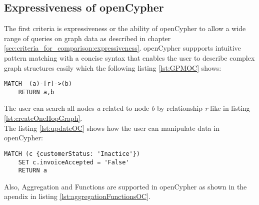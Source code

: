 \subsection{Expressiveness of openCypher}
\label{subsec:different_query_languages_for_graph_databases:openCypher:expressiveness}
The first criteria is expressiveness or the ability of openCypher to allow a wide
range of queries on graph data as described in chapter \ref{sec:criteria_for_comparison:expressiveness}. 
openCypher suppports intuitive pattern matching with a concise syntax that enables the
user to describe complex graph structures easily which the following listing \ref{lst:GPMOC} shows:
\begin{lstlisting}[caption={Graph Pattern Matching in openCypher}, label={lst:GPMOC}] 
	MATCH  (a)-[r]->(b)
	RETURN a,b
\end{lstlisting} 
The user can search all nodes \textit{a} related to node \textit{b} by relationship \textit{r}
like in listing \ref{lst:createOneHopGraph}.\\
The listing \ref{lst:updateOC} shows how the user can manipulate data in openCypher:

\begin{lstlisting}[caption={Graph Pattern Matching in openCypher}, label={lst:updateOC}] 
	MATCH (c {customerStatus: 'Inactice'})
	SET c.invoiceAccepted = 'False'
	RETURN a
\end{lstlisting}
Also, Aggregation and Functions are supported in openCypher 
as shown in the apendix in listing \ref{lst:aggregationFunctionsOC}.

